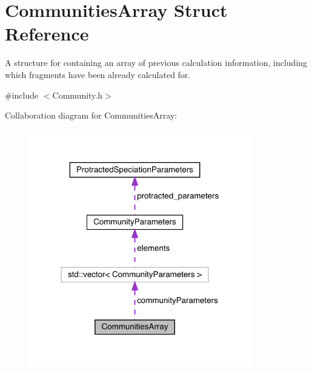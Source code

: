 \hypertarget{struct_communities_array}{}\section{Communities\+Array Struct Reference}
\label{struct_communities_array}


A structure for containing an array of previous calculation information, including which fragments have been already calculated for.  




{\ttfamily \#include $<$Community.\+h$>$}



Collaboration diagram for Communities\+Array\+:
\nopagebreak
\begin{figure}[H]
\begin{center}
\leavevmode
\includegraphics[width=275pt]{struct_communities_array__coll__graph}
\end{center}
\end{figure}
